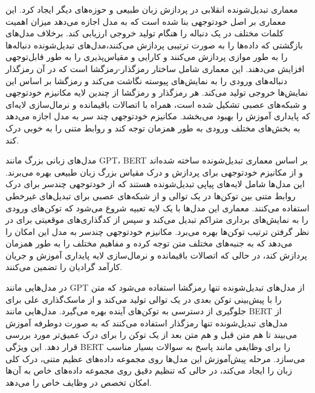 


معماری تبدیل‌شونده  انقلابی در پردازش زبان طبیعی و حوزه‌های دیگر ایجاد کرد. این معماری بر اصل خودتوجهی بنا شده است که به مدل اجازه می‌دهد میزان اهمیت کلمات مختلف در یک دنباله را هنگام تولید خروجی ارزیابی کند. برخلاف مدل‌های بازگشتی که داده‌ها را به صورت ترتیبی پردازش می‌کنند،مدل‌های تبدیل‌شونده دنباله‌ها را به طور موازی پردازش می‌کنند و کارایی و مقیاس‌پذیری را به طور قابل‌توجهی افزایش می‌دهند. این معماری شامل ساختار رمز‌گذار-رمزگشا است که در آن رمزگذار دنباله‌های ورودی را به نمایش‌های پیوسته نگاشت می‌کند و رمزگشا بر اساس این نمایش‌ها خروجی تولید می‌کند. هر رمزگذار و رمزگشا از چندین لایه مکانیزم خودتوجهی و شبکه‌های عصبی تشکیل شده است، همراه با اتصالات باقیمانده و نرمال‌سازی لایه‌ای که پایداری آموزش را بهبود می‌بخشد. مکانیزم خودتوجهی چند سر به مدل اجازه می‌دهد به بخش‌های مختلف ورودی به طور همزمان توجه کند و روابط متنی را به خوبی درک کند.



مدل‌های زبانی بزرگ مانند GPT، BERT  بر اساس معماری تبدیل‌شونده ساخته شده‌اند و از مکانیزم خودتوجهی برای پردازش و درک مقیاس بزرگ زبان طبیعی بهره می‌برند. این مدل‌ها شامل لایه‌های پیاپی تبدیل‌شونده هستند که از خودتوجهی چندسر برای درک روابط متنی بین توکن‌ها در یک توالی و از شبکه‌های عصبی برای تبدیل‌های غیرخطی استفاده می‌کنند. معماری این مدل‌ها با یک لایه تعبیه شروع می‌شود که توکن‌های ورودی را به نمایش‌های برداری متراکم تبدیل می‌کند و سپس از کدگذاری‌های موقعیتی برای در نظر گرفتن ترتیب توکن‌ها بهره می‌برد. مکانیزم خودتوجهی چندسر به مدل این امکان را می‌دهد که به جنبه‌های مختلف متن توجه کرده و مفاهیم مختلف را به طور همزمان پردازش کند، در حالی که اتصالات باقیمانده و نرمال‌سازی لایه پایداری آموزش و جریان کارآمد گرادیان را تضمین می‌کنند.

در مدل‌هایی مانند GPT  از مدل‌های تبدیل‌شونده تنها رمزگشا استفاده می‌شود که متن را با پیش‌بینی توکن بعدی در یک توالی تولید می‌کند و از ماسک‌گذاری علی برای جلوگیری از دسترسی به توکن‌های آینده بهره می‌گیرد. مدل‌هایی مانند BERT  از مدل‌های تبدیل‌شونده تنها رمزگذار استفاده می‌کنند که به صورت دوطرفه آموزش می‌بیند تا هم متن قبل و هم متن بعد از یک توکن را برای درک عمیق‌تر مورد بررسی قرار دهد. این ویژگی BERT را برای وظایفی مانند پاسخ به سوالات بسیار مناسب می‌سازد. مرحله پیش‌آموزش این مدل‌ها روی مجموعه داده‌های عظیم متنی، درک کلی زبان را ایجاد می‌کند، در حالی که تنظیم دقیق روی مجموعه داده‌های خاص به آن‌ها امکان تخصص در وظایف خاص را می‌دهد.

